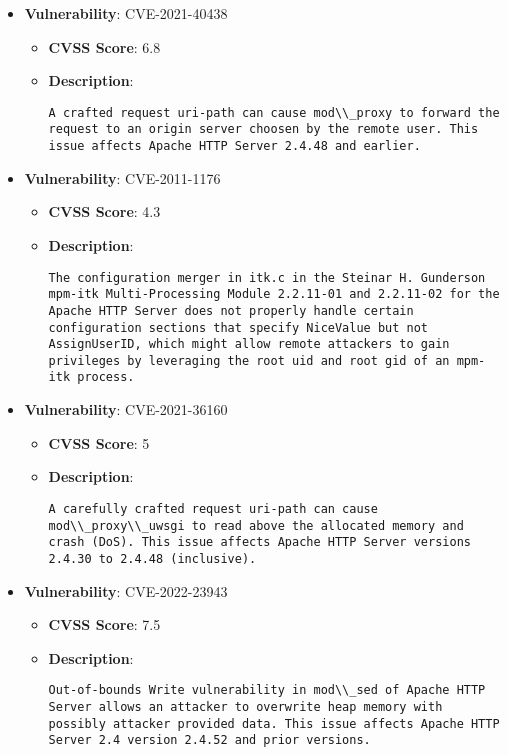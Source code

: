 \documentclass{article}
\begin{document}
\begin{itemize}
        \item \textbf{Vulnerability}: CVE-2021-40438
        \begin{itemize}
            \item \textbf{CVSS Score}:  6.8 
            \item \textbf{Description}:
            \parbox[t]{0.9\linewidth}{
                \verb|A crafted request uri-path can cause mod\\_proxy to forward the request to an origin server choosen by the remote user. This issue affects Apache HTTP Server 2.4.48 and earlier.|
            }
        \end{itemize}
    
        \item \textbf{Vulnerability}: CVE-2011-1176
        \begin{itemize}
            \item \textbf{CVSS Score}:  4.3 
            \item \textbf{Description}:
            \parbox[t]{0.9\linewidth}{
                \verb|The configuration merger in itk.c in the Steinar H. Gunderson mpm-itk Multi-Processing Module 2.2.11-01 and 2.2.11-02 for the Apache HTTP Server does not properly handle certain configuration sections that specify NiceValue but not AssignUserID, which might allow remote attackers to gain privileges by leveraging the root uid and root gid of an mpm-itk process.|
            }
        \end{itemize}
    
        \item \textbf{Vulnerability}: CVE-2021-36160
        \begin{itemize}
            \item \textbf{CVSS Score}:  5 
            \item \textbf{Description}:
            \parbox[t]{0.9\linewidth}{
                \verb|A carefully crafted request uri-path can cause mod\\_proxy\\_uwsgi to read above the allocated memory and crash (DoS). This issue affects Apache HTTP Server versions 2.4.30 to 2.4.48 (inclusive).|
            }
        \end{itemize}
    
        \item \textbf{Vulnerability}: CVE-2022-23943
        \begin{itemize}
            \item \textbf{CVSS Score}:  7.5 
            \item \textbf{Description}:
            \parbox[t]{0.9\linewidth}{
                \verb|Out-of-bounds Write vulnerability in mod\\_sed of Apache HTTP Server allows an attacker to overwrite heap memory with possibly attacker provided data. This issue affects Apache HTTP Server 2.4 version 2.4.52 and prior versions.|
            }
        \end{itemize}
    

\end{itemize}
\end{document}

